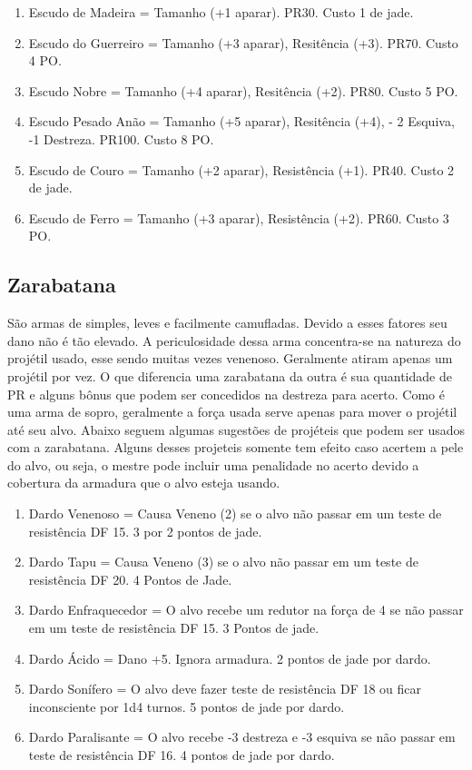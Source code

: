 \begin{enumerate}
	\item Escudo de Madeira = Tamanho (+1 aparar). PR30.  Custo 1 de jade.
	\item Escudo do Guerreiro = Tamanho (+3 aparar), Resitência (+3). PR70.  Custo 4 PO.
	\item Escudo Nobre = Tamanho (+4 aparar), Resitência (+2). PR80.  Custo 5 PO.	
	\item Escudo Pesado Anão = Tamanho (+5 aparar), Resitência (+4), - 2 Esquiva, -1 Destreza. PR100.  Custo 8 PO.
	\item Escudo de Couro = Tamanho (+2 aparar), Resistência (+1). PR40. Custo 2 de jade.
	\item Escudo de Ferro = Tamanho (+3 aparar), Resistência (+2). PR60. Custo 3 PO.
\end{enumerate}



\subsection{Zarabatana}
São armas de simples, leves e facilmente camufladas. Devido a esses fatores seu dano não é tão elevado. A periculosidade dessa arma concentra-se na natureza do projétil usado, esse sendo muitas vezes venenoso. Geralmente atiram apenas um projétil por vez. O que diferencia uma zarabatana da outra é sua quantidade de PR e alguns bônus que podem ser concedidos na destreza para acerto. Como é uma arma de sopro, geralmente a força usada serve apenas para mover o projétil até seu alvo. Abaixo seguem algumas sugestões de projéteis que podem ser usados com a zarabatana. Alguns desses projeteis somente tem efeito caso acertem a pele do alvo, ou seja, o mestre pode incluir uma penalidade no acerto devido a cobertura da armadura que o alvo esteja usando.


\begin{enumerate}

	\item Dardo Venenoso = Causa Veneno (2) se o alvo não passar em um teste de resistência DF 15. 3 por 2 pontos de jade.	 
	\item Dardo Tapu = Causa Veneno (3) se o alvo não passar em um teste de resistência DF 20. 4 Pontos de Jade. 
	\item Dardo Enfraquecedor = O alvo recebe um redutor na força de 4 se não passar em um teste de resistência DF 15. 3 Pontos de jade.
	\item Dardo Ácido = Dano +5. Ignora armadura. 2 pontos de jade por dardo.
	\item Dardo Sonífero = O alvo deve fazer teste de resistência DF 18 ou ficar inconsciente por 1d4 turnos. 5 pontos de jade por dardo.
	\item Dardo Paralisante = O alvo recebe -3 destreza e -3 esquiva se não passar em teste de resistência DF 16. 4 pontos de jade por dardo.
	
\end{enumerate}


